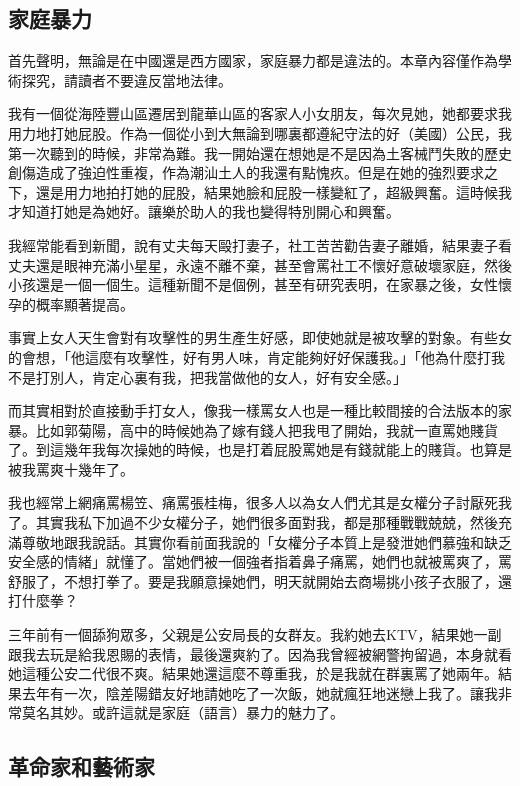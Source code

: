 \subsection{家庭暴力}

首先聲明，無論是在中國還是西方國家，家庭暴力都是違法的。本章內容僅作為學術探究，請讀者不要違反當地法律。

我有一個從海陸豐山區遷居到龍華山區的客家人小女朋友，每次見她，她都要求我用力地打她屁股。作為一個從小到大無論到哪裏都遵紀守法的好（美國）公民，我第一次聽到的時候，非常為難。我一開始還在想她是不是因為土客械鬥失敗的歷史創傷造成了強迫性重複，作為潮汕土人的我還有點愧疚。但是在她的強烈要求之下，還是用力地拍打她的屁股，結果她臉和屁股一樣變紅了，超級興奮。這時候我才知道打她是為她好。讓樂於助人的我也變得特別開心和興奮。

我經常能看到新聞，說有丈夫每天毆打妻子，社工苦苦勸告妻子離婚，結果妻子看丈夫還是眼神充滿小星星，永遠不離不棄，甚至會罵社工不懷好意破壞家庭，然後小孩還是一個一個生。這種新聞不是個例，甚至有研究表明，在家暴之後，女性懷孕的概率顯著提高。

事實上女人天生會對有攻擊性的男生產生好感，即使她就是被攻擊的對象。有些女的會想，「他這麼有攻擊性，好有男人味，肯定能夠好好保護我。」「他為什麼打我不是打別人，肯定心裏有我，把我當做他的女人，好有安全感。」

而其實相對於直接動手打女人，像我一樣罵女人也是一種比較間接的合法版本的家暴。比如郭菊陽，高中的時候她為了嫁有錢人把我甩了開始，我就一直罵她賤貨了。到這幾年我每次操她的時候，也是打着屁股罵她是有錢就能上的賤貨。也算是被我罵爽十幾年了。

我也經常上網痛罵楊笠、痛罵張桂梅，很多人以為女人們尤其是女權分子討厭死我了。其實我私下加過不少女權分子，她們很多面對我，都是那種戰戰兢兢，然後充滿尊敬地跟我說話。其實你看前面我說的「女權分子本質上是發泄她們慕強和缺乏安全感的情緒」就懂了。當她們被一個強者指着鼻子痛罵，她們也就被罵爽了，罵舒服了，不想打拳了。要是我願意操她們，明天就開始去商場挑小孩子衣服了，還打什麼拳？

三年前有一個舔狗眾多，父親是公安局長的女群友。我約她去KTV，結果她一副跟我去玩是給我恩賜的表情，最後還爽約了。因為我曾經被網警拘留過，本身就看她這種公安二代很不爽。結果她還這麼不尊重我，於是我就在群裏罵了她兩年。結果去年有一次，陰差陽錯友好地請她吃了一次飯，她就瘋狂地迷戀上我了。讓我非常莫名其妙。或許這就是家庭（語言）暴力的魅力了。

\subsection{革命家和藝術家}

